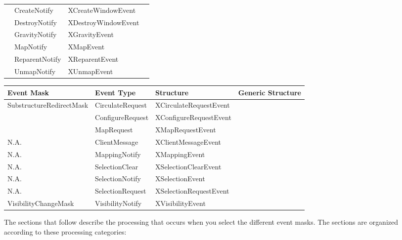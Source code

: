 \documentclass{report}
\begin{document}
\begin{itemize}
\begin{center}
\begin{tabularx}{\textwidth}{@{}XlXl@{}}
                                        &CreateNotify &XCreateWindowEvent & \\[2ex]
                                        &DestroyNotify &XDestroyWindowEvent &\\[2ex]
                                        &GravityNotify &XGravityEvent  & \\[2ex]
                                        &MapNotify &XMapEvent&\\[2ex]
                                        &ReparentNotify &XReparentEvent&\\[2ex]
                                        &UnmapNotify &XUnmapEvent&\\
                    \bottomrule
                \end{tabularx}
            \end{center}
            \begin{center}
                \begin{tabularx}{\textwidth}{@{}XlXl@{}}
                    \toprule
                    \textbf{Event Mask}& \textbf{Event Type}& \textbf{Structure} &\textbf{Generic Structure} \\
                    \midrule
                    SubstructureRedirectMask &CirculateRequest &XCirculateRequestEvent&\\[2ex]
                                             &ConfigureRequest &XConfigureRequestEvent&\\[2ex]
                                             &MapRequest &XMapRequestEvent&\\[2ex]
                    N.A. &ClientMessage &XClientMessageEvent& \\[2ex]
                    N.A. &MappingNotify &XMappingEvent& \\[2ex]
                    N.A. &SelectionClear& XSelectionClearEvent& \\[2ex]
                    N.A. &SelectionNotify& XSelectionEvent& \\[2ex]
                    N.A. &SelectionRequest& XSelectionRequestEvent& \\[2ex]
                    VisibilityChangeMask &VisibilityNotify &XVisibilityEvent &\\
                    \bottomrule
                \end{tabularx}
            \end{center}
            The sections that follow describe the processing that occurs when you select the different event masks. The sections are organized according to these processing categories:

\end{itemize}
\end{document}
